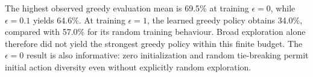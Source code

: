 The highest observed greedy evaluation mean is 69.5\% at training $\epsilon=0$, while $\epsilon=0.1$ yields 64.6\%. At training $\epsilon=1$, the learned greedy policy obtains 34.0\%, compared with 57.0\% for its random training behaviour. Broad exploration alone therefore did not yield the strongest greedy policy within this finite budget. The $\epsilon=0$ result is also informative: zero initialization and random tie-breaking permit initial action diversity even without explicitly random exploration.\par

